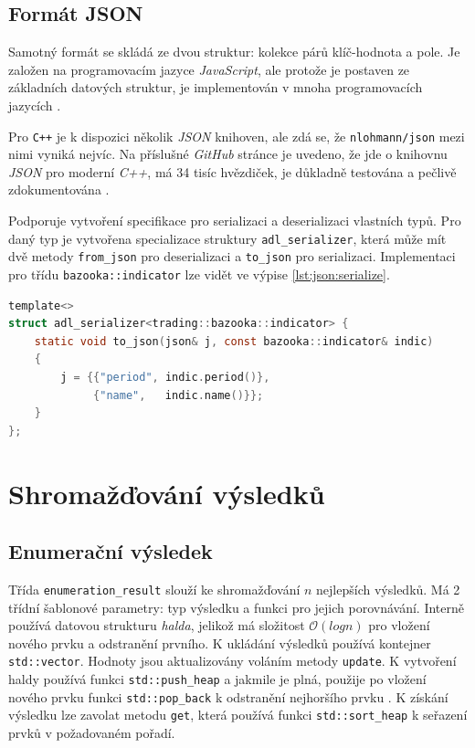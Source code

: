 \subsection{Formát JSON}
Samotný formát se skládá ze dvou struktur: kolekce párů klíč-hodnota a pole.
Je založen na programovacím jazyce \textit{JavaScript}, ale protože je postaven ze základních datových struktur, je implementován v mnoha programovacích jazycích \cite{json}.

Pro \texttt{C++} je k dispozici několik \textit{JSON} knihoven, ale zdá se, že \texttt{nlohmann/json} mezi nimi vyniká nejvíc.
Na příslušné \textit{GitHub} stránce je uvedeno, že jde o knihovnu \textit{JSON} pro moderní \textit{C++}, má 34 tisíc hvězdiček, je důkladně testována a pečlivě zdokumentována \cite{lohmann}.

Podporuje vytvoření specifikace pro serializaci a deserializaci vlastních typů.
Pro daný typ je vytvořena specializace struktury \texttt{adl\_serializer}, která může mít dvě metody \texttt{from\_json} pro deserializaci a \texttt{to\_json} pro serializaci.
Implementaci pro třídu \texttt{bazooka::indicator} lze vidět ve výpise \ref{lst:json:serialize}.

\begin{lstlisting}[caption={~Implementace deserializace pro vlastní datový typ},label={lst:json:serialize},captionpos=t,abovecaptionskip=-\medskipamount,belowcaptionskip=\medskipamount,language=C]
template<>
struct adl_serializer<trading::bazooka::indicator> {
    static void to_json(json& j, const bazooka::indicator& indic)
    {
        j = {{"period", indic.period()},
             {"name",   indic.name()}};
    }
};
\end{lstlisting}

\section{Shromažďování výsledků}

\subsection{Enumerační výsledek}
Třída \texttt{enumeration\_result} slouží ke shromažďování $n$ nejlepších výsledků.
Má 2 třídní šablonové parametry: typ výsledku a funkci pro jejich porovnávání.
Interně používá datovou strukturu \textit{halda}, jelikož má složitost $\mathcal{O}(log{}n)$ pro vložení nového prvku a odstranění prvního.
K ukládání výsledků používá kontejner \texttt{std::vector}.
Hodnoty jsou aktualizovány voláním metody \texttt{update}.
K vytvoření haldy používá funkci \texttt{std::push\_heap} a jakmile je plná, použije po vložení nového prvku funkci \texttt{std::pop\_back} k odstranění nejhoršího prvku \cite{push-heap}.
K získání výsledku lze zavolat metodu \texttt{get}, která používá funkci \texttt{std::sort\_heap} k seřazení prvků v požadovaném pořadí.

